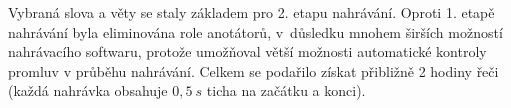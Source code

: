 Vybraná slova a věty se staly základem pro 2. etapu nahrávání.
Oproti 1. etapě nahrávání byla eliminována role anotátorů, v~důsledku mnohem širších možností nahrávacího softwaru, protože umožňoval větší možnosti automatické kontroly promluv v průběhu nahrávání.
Celkem se podařilo získat přibližně 2 hodiny řeči (každá nahrávka obsahuje $0,5\ s$ ticha na začátku a konci).



